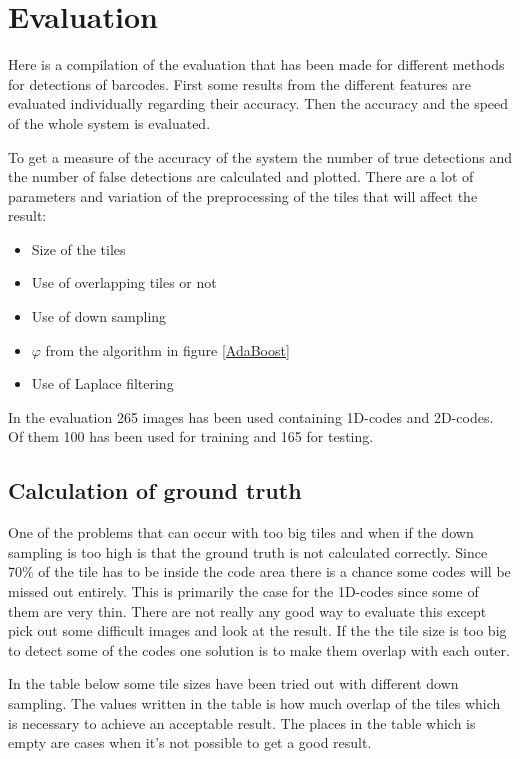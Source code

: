 \chapter{Evaluation}
\label{sec:Evaluation}
Here is a compilation of the evaluation that has been made for different methods for detections of barcodes. First some results from the different features are evaluated individually regarding their accuracy. Then the accuracy and the speed of the whole system is evaluated.

To get a measure of the accuracy of the system the number of true detections and the number of false detections are calculated and plotted. There are a lot of parameters and variation of the preprocessing of the tiles that will affect the result:

 \begin{itemize}
 	\item Size of the tiles
 	\item Use of overlapping tiles or not
 	\item Use of down sampling
 	\item $\varphi$ from the algorithm in figure \ref{AdaBoost}
 	\item Use of Laplace filtering 
 \end{itemize}

In the evaluation 265 images has been used containing 1D-codes and 2D-codes. Of them 100 has been used for training and 165 for testing.

\section{Calculation of ground truth}
\label{sec:Calculation of ground truth}
One of the problems that can occur with too big tiles and when if the down sampling is too high is that the ground truth is not calculated correctly. Since 70\% of the tile has to be inside the code area there is a chance some codes will be missed out entirely. This is primarily the case for the 1D-codes since some of them are very thin. There are not really any good way to evaluate this except pick out some difficult images and look at the result. If the the tile size is too big to detect some of the codes one solution is to make them overlap with each outer. 

In the table below some tile sizes have been tried out with different down sampling. The values written in the table is how much overlap of the tiles which is necessary to achieve an acceptable result. The places in the table which is empty are cases when it's not possible to get a good result.

